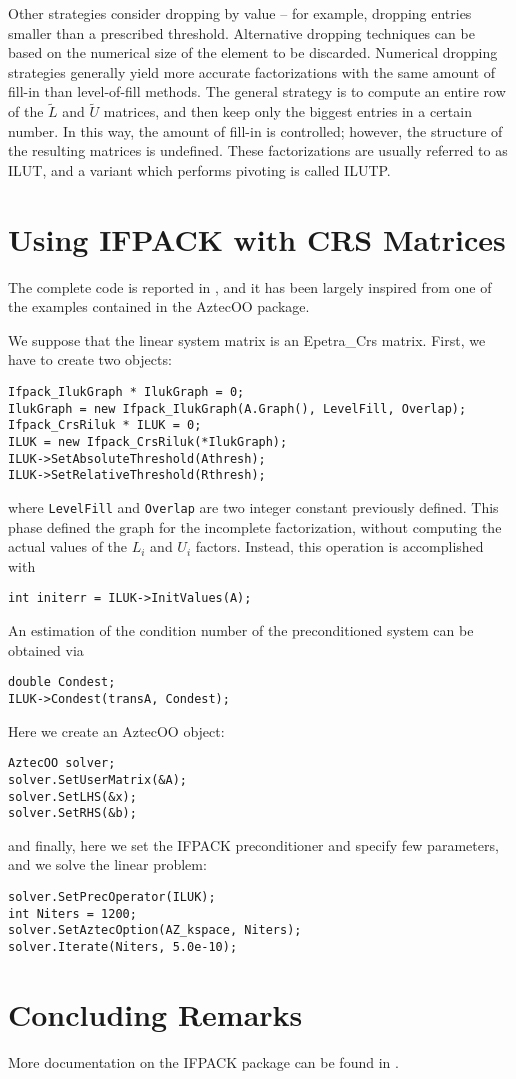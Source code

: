 Other strategies consider dropping by value -- for example, dropping
entries smaller than a prescribed threshold. Alternative dropping
techniques can be based on the numerical size of the element to be
discarded. Numerical dropping strategies generally yield more accurate
factorizations with the same amount of fill-in than level-of-fill
methods. The general strategy is to compute an entire row of the
$\tilde{L}$ and $\tilde{U}$ matrices, and then keep only the biggest
entries in a certain number. In this way, the amount of fill-in is
controlled; however, the structure of the resulting matrices is
undefined. These factorizations are usually referred to as ILUT, and a
variant which performs pivoting is called ILUTP.


\section{Using IFPACK with CRS Matrices}
\label{sec:ifpack_crs}

The complete code is reported in , and it has
been largely inspired from one of the examples contained in the AztecOO
package.

We suppose that the linear system matrix is an Epetra\_Crs matrix. 
First, we have to create two objects: 
\begin{verbatim}
Ifpack_IlukGraph * IlukGraph = 0;
IlukGraph = new Ifpack_IlukGraph(A.Graph(), LevelFill, Overlap);
Ifpack_CrsRiluk * ILUK = 0;
ILUK = new Ifpack_CrsRiluk(*IlukGraph);
ILUK->SetAbsoluteThreshold(Athresh);
ILUK->SetRelativeThreshold(Rthresh);
\end{verbatim}
where \verb!LevelFill! and \verb!Overlap! are two integer constant
previously defined. This phase defined the graph for the incomplete
factorization, without computing the actual values of the $L_i$ and
$U_i$ factors. Instead, this operation is accomplished with
\begin{verbatim}
int initerr = ILUK->InitValues(A);
\end{verbatim}
An estimation of the condition number of the preconditioned system can
be obtained via
\begin{verbatim}
double Condest;
ILUK->Condest(transA, Condest);
\end{verbatim}
Here we create an AztecOO object:
\begin{verbatim}
AztecOO solver;
solver.SetUserMatrix(&A);
solver.SetLHS(&x);
solver.SetRHS(&b);
\end{verbatim}
and finally, here we set the IFPACK preconditioner and specify few
parameters, and we solve the linear problem:
\begin{verbatim}
solver.SetPrecOperator(ILUK);
int Niters = 1200;
solver.SetAztecOption(AZ_kspace, Niters); 
solver.Iterate(Niters, 5.0e-10);
\end{verbatim}



\section{Concluding Remarks}
\label{sec:ifpack_concluding}

More documentation on the IFPACK package can be found in
\cite{Ifpack-Ref-Guide,Ifpack-User-Guide}.

